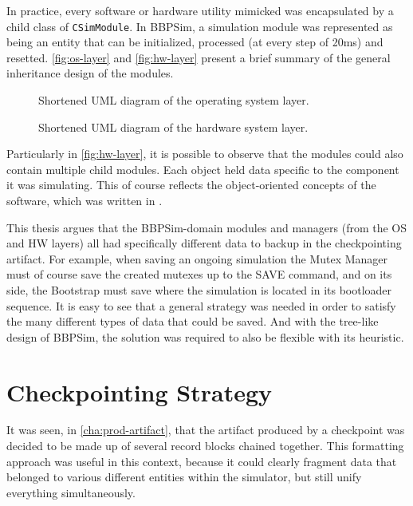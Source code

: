 {In practice, every software or hardware utility mimicked was encapsulated by a child class of \texttt{CSimModule}. In BBPSim, a simulation module was represented as being an entity that can be initialized, processed (at every step of 20ms) and resetted. \autoref{fig:os-layer} and \autoref{fig:hw-layer} present a brief summary of the general inheritance design of the modules. 
\begin{figure}[htbp]
	\vspace{12pt}
	\centering
	\footnotesize
	
	\caption{Shortened UML diagram of the operating system layer.}
	\label{fig:os-layer}
\end{figure}
\begin{figure}[htbp]
	\vspace{12pt}
	\centering
	\footnotesize
	
	\caption{Shortened UML diagram of the hardware system layer.}
	\label{fig:hw-layer}
\end{figure}

Particularly in \autoref{fig:hw-layer}, it is possible to observe that the modules could also contain multiple child modules. Each object held data specific to the component it was simulating. This of course reflects the object-oriented concepts of the software, which was written in \Cpp.

This thesis argues that the BBPSim-domain modules and managers (from the OS and HW layers) all had specifically different data to backup in the checkpointing artifact. For example, when saving an ongoing simulation the Mutex Manager must of course save the created mutexes up to the SAVE command, and on its side, the Bootstrap must save where the simulation is located in its bootloader sequence. It is easy to see that a general strategy was needed in order to satisfy the many different types of data that could be saved. And with the tree-like design of BBPSim, the solution was required to also be flexible with its heuristic. 

\section{Checkpointing Strategy}
It was seen, in \autoref{cha:prod-artifact}, that the artifact produced by a checkpoint was decided to be made up of several record blocks chained together. This formatting approach was useful in this context, because it could clearly fragment data that belonged to various different entities within the simulator, but still unify everything simultaneously. 

}
